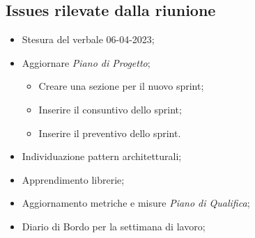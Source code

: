 \subsection{Issues rilevate dalla riunione}
\begin{itemize}
    \item Stesura del verbale 06-04-2023;
    \item Aggiornare \textit{Piano di Progetto};
    \begin{itemize}
        \item Creare una sezione per il nuovo sprint;
        \item Inserire il consuntivo dello sprint;
        \item Inserire il preventivo dello sprint.
    \end{itemize}
    \item Individuazione pattern architetturali;
    \item Apprendimento librerie;
    \item Aggiornamento metriche e misure \textit{Piano di Qualifica};
    \item Diario di Bordo per la settimana di lavoro;
\end{itemize}